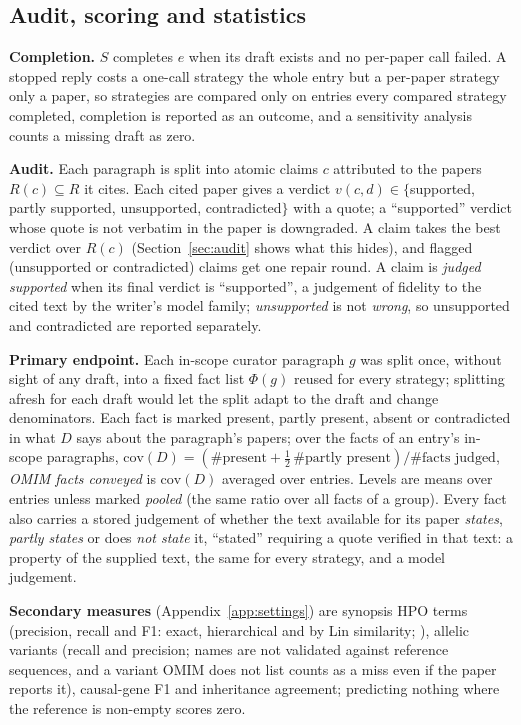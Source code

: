 \documentclass{article} %
\begin{document}
\subsection{Audit, scoring and statistics}
\label{sec:scoring}
\textbf{Completion.} $S$ completes $e$ when its draft exists and no per-paper call failed. A stopped reply costs a one-call strategy the whole entry but a per-paper strategy only a paper, so strategies are compared only on entries every compared strategy completed, completion is reported as an outcome, and a sensitivity analysis counts a missing draft as zero.

\textbf{Audit.} Each paragraph is split into atomic claims $c$ attributed to the papers $R(c)\subseteq R$ it cites. Each cited paper gives a verdict $v(c,d)\in\{$supported, partly supported, unsupported, contradicted$\}$ with a quote; a ``supported'' verdict whose quote is not verbatim in the paper is downgraded. A claim takes the best verdict over $R(c)$ (Section~\ref{sec:audit} shows what this hides), and flagged (unsupported or contradicted) claims get one repair round. A claim is \emph{judged supported} when its final verdict is ``supported'', a judgement of fidelity to the cited text by the writer's model family; \emph{unsupported} is not \emph{wrong}, so unsupported and contradicted are reported separately.

\textbf{Primary endpoint.} Each in-scope curator paragraph $g$ was split once, without sight of any draft, into a fixed fact list $\Phi(g)$ reused for every strategy; splitting afresh for each draft would let the split adapt to the draft and change denominators. Each fact is marked present, partly present, absent or contradicted in what $D$ says about the paragraph's papers; over the facts of an entry's in-scope paragraphs, $\mathrm{cov}(D)=(\#\text{present}+\tfrac12\,\#\text{partly present})/\#\text{facts judged}$, \emph{OMIM facts conveyed} is $\mathrm{cov}(D)$ averaged over entries. Levels are means over entries unless marked \emph{pooled} (the same ratio over all facts of a group). Every fact also carries a stored judgement of whether the text available for its paper \emph{states}, \emph{partly states} or does \emph{not state} it, ``stated'' requiring a quote verified in that text: a property of the supplied text, the same for every strategy, and a model judgement.

\textbf{Secondary measures} (Appendix~\ref{app:settings}) are synopsis HPO terms (precision, recall and F1: exact, hierarchical and by Lin similarity; \citealp{Khler2009ClinicalDiagnostics,Resnik1995UsingInformation}), allelic variants (recall and precision; names are not validated against reference sequences, and a variant OMIM does not list counts as a miss even if the paper reports it), causal-gene F1 and inheritance agreement; predicting nothing where the reference is non-empty scores zero.
\end{document}
